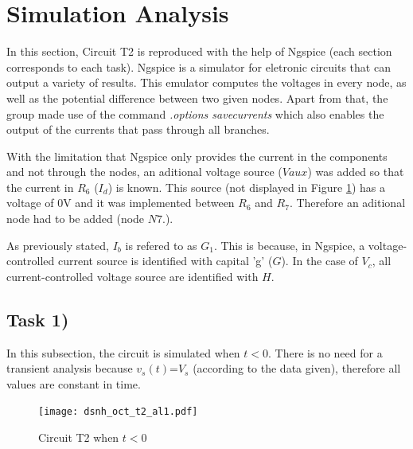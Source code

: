 \section{Simulation Analysis}
\label{sec:simulation}


In this section, Circuit T2 is reproduced with the help of Ngspice (each section corresponds
to each task). Ngspice is a simulator for eletronic circuits that can output a variety of results.
This emulator computes the voltages in every node, as well as the potential difference
between two given nodes. Apart from that, the group made use of the command
{\em .options savecurrents} which also enables the output of the currents that pass
through all branches.

With the limitation that Ngspice only provides the current in the components and not through
the nodes, an aditional voltage source ($Vaux$) was added so that the current in $R_6$ ($I_d$)
is known. This source (not displayed in Figure \ref{fig:Dsnh_sim_t2}) has a voltage of 0V and it 
was implemented between $R_6$ and $R_7$. Therefore an aditional node had to be added (node $N7.$).

As previously stated, $I_b$ is refered to as $G_1$. This is because, in Ngspice, a
voltage-controlled current source is identified with capital 'g' ($G$). In the case of
$V_c$, all current-controlled voltage source are identified with $H$.


\subsection{Task 1)}
\label{subsec:task1_s}


In this subsection, the circuit is simulated when $t<0$. There is no need for a
transient analysis because $v_s(t)$=$V_s$ (according to the data given), therefore
all values are constant in time. 

\begin{figure}[ht]
	\centering
	\texttt{[image: dsnh\_oct\_t2\_al1.pdf]}
	\caption{Circuit T2 when $t<0$}
\label{fig:Dsnh_sim_t2}
\end{figure}


